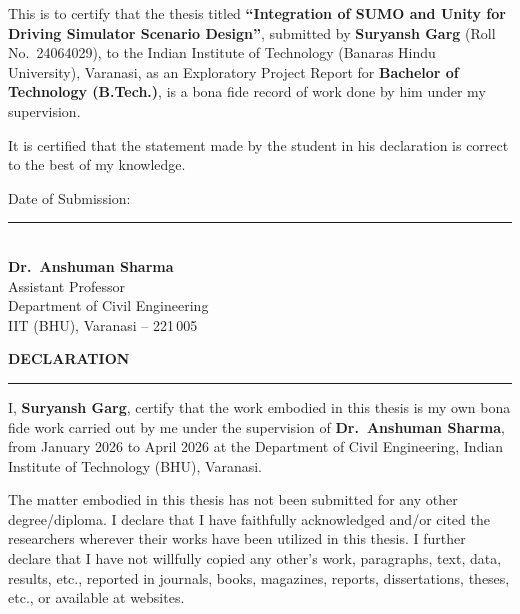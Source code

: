 \documentclass[12pt,a4paper,oneside]{report}
\begin{document}
This is to certify that the thesis titled \textbf{\color{PrimaryNavy}``Integration of SUMO and Unity for Driving Simulator Scenario Design''}, submitted by \textbf{Suryansh Garg} (Roll No.\ 24064029), to the Indian Institute of Technology (Banaras Hindu University), Varanasi, as an Exploratory Project Report for \textbf{Bachelor of Technology (B.Tech.)}, is a bona fide record of work done by him under my supervision.

It is certified that the statement made by the student in his declaration is correct to the best of my knowledge.

\vspace{2cm}

\noindent Date of Submission: \textcolor{BorderColor}{\hrulefill}

\vspace{3cm}

\hfill
\begin{minipage}[t]{0.45\textwidth}
\centering
{\color{PrimaryNavy}\rule{5cm}{0.8pt}}\\[6pt]
\textbf{Dr.\ Anshuman Sharma}\\
{\color{LightSlate}\small Assistant Professor\\
Department of Civil Engineering\\
IIT (BHU), Varanasi -- 221\,005}
\end{minipage}

\newpage
\thispagestyle{empty}

\begin{center}
    {\color{PrimaryNavy}\fontsize{20}{24}\selectfont\bfseries DECLARATION}\\[4pt]
    {\color{AccentTeal}\rule{3cm}{2pt}}
\end{center}
\vspace{0.8cm}

I, \textbf{Suryansh Garg}, certify that the work embodied in this thesis is my own bona fide work carried out by me under the supervision of \textbf{Dr.\ Anshuman Sharma}, from January 2026 to April 2026 at the Department of Civil Engineering, Indian Institute of Technology (BHU), Varanasi.

The matter embodied in this thesis has not been submitted for any other degree/diploma. I declare that I have faithfully acknowledged and/or cited the researchers wherever their works have been utilized in this thesis. I further declare that I have not willfully copied any other's work, paragraphs, text, data, results, etc., reported in journals, books, magazines, reports, dissertations, theses, etc., or available at websites.
\end{document}
